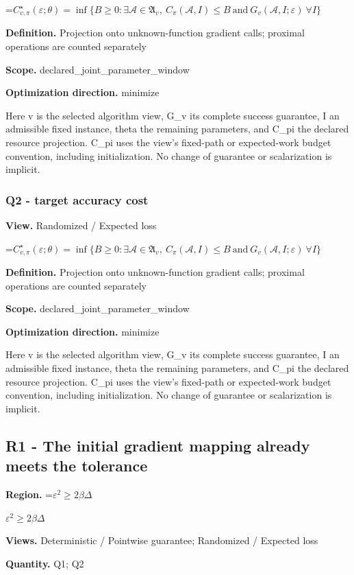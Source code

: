 \documentclass[10pt,a4paper]{article}
\newcommand{\AtlasMath}[1]{\par\begingroup\centering\setbox0=\hbox{$\displaystyle #1$}\ifdim\wd0>1.4\linewidth\typeout{ATLAS WIDE FORMULA: \the\wd0}\fi\ifdim\wd0>\linewidth\resizebox{\linewidth}{!}{\box0}\else\box0\fi\par\endgroup}
\newcommand{\AtlasInlineMath}[1]{\begingroup\setbox0=\hbox{$#1$}\ifdim\wd0>.4\linewidth\endgroup\AtlasMath{#1}\else\endgroup$#1$\fi}
\begin{document}
\AtlasMath{C^\star_{v,\pi}(\varepsilon;\theta)=\inf\{B\ge0:\exists\mathcal A\in\mathfrak A_v,\ C_\pi(\mathcal A,I)\le B\ \text{and}\ G_v(\mathcal A,I;\varepsilon)\ \forall I\}}
\textbf{Definition.} Projection onto unknown-function gradient calls; proximal operations are counted separately

\textbf{Scope.} declared\_joint\_parameter\_window

\textbf{Optimization direction.} minimize

Here v is the selected algorithm view, G\_v its complete success guarantee, I an admissible fixed instance, theta the remaining parameters, and C\_pi the declared resource projection. C\_pi uses the view's fixed-path or expected-work budget convention, including initialization. No change of guarantee or scalarization is implicit.

\subsubsection{Q2 - target accuracy cost}
\textbf{View.} Randomized / Expected loss

\AtlasMath{C^\star_{v,\pi}(\varepsilon;\theta)=\inf\{B\ge0:\exists\mathcal A\in\mathfrak A_v,\ C_\pi(\mathcal A,I)\le B\ \text{and}\ G_v(\mathcal A,I;\varepsilon)\ \forall I\}}
\textbf{Definition.} Projection onto unknown-function gradient calls; proximal operations are counted separately

\textbf{Scope.} declared\_joint\_parameter\_window

\textbf{Optimization direction.} minimize

Here v is the selected algorithm view, G\_v its complete success guarantee, I an admissible fixed instance, theta the remaining parameters, and C\_pi the declared resource projection. C\_pi uses the view's fixed-path or expected-work budget convention, including initialization. No change of guarantee or scalarization is implicit.

\subsection{R1 - The initial gradient mapping already meets the tolerance}
\textbf{Region.} \AtlasInlineMath{\varepsilon^2\ge2\beta\Delta}

\textbf{Views.} Deterministic / Pointwise guarantee; Randomized / Expected loss

\textbf{Quantity.} Q1; Q2
\end{document}
